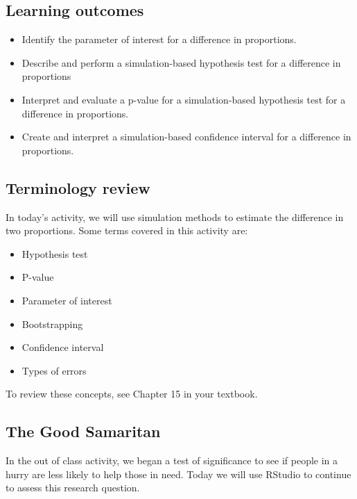 \documentclass[
]{report}
\begin{document}

\hypertarget{learning-outcomes-15}{%
\subsection{Learning outcomes}\label{learning-outcomes-15}}

\begin{itemize}
\item
  Identify the parameter of interest for a difference in proportions.
\item
  Describe and perform a simulation-based hypothesis test for a difference in proportions
\item
  Interpret and evaluate a p-value for a simulation-based hypothesis test for a difference in proportions.
\item
  Create and interpret a simulation-based confidence interval for a difference in proportions.
\end{itemize}

\hypertarget{terminology-review-14}{%
\subsection{Terminology review}\label{terminology-review-14}}

In today's activity, we will use simulation methods to estimate the difference in two proportions. Some terms covered in this activity are:

\begin{itemize}
\item
  Hypothesis test
\item
  P-value
\item
  Parameter of interest
\item
  Bootstrapping
\item
  Confidence interval
\item
  Types of errors
\end{itemize}

To review these concepts, see Chapter 15 in your textbook.

\hypertarget{the-good-samaritan-1}{%
\subsection{The Good Samaritan}\label{the-good-samaritan-1}}

In the out of class activity, we began a test of significance to see if people in a hurry are less likely to help those in need. Today we will use RStudio to continue to assess this research question.
\end{document}
